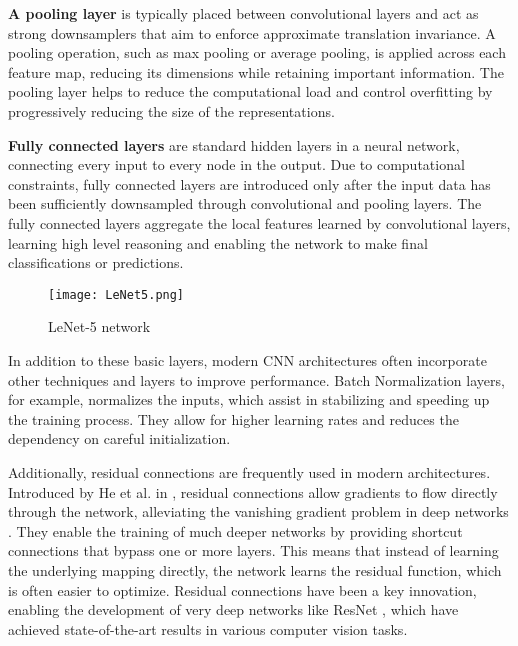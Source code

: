 \documentclass[../../thesis.tex]{subfiles}
\begin{document}
\textbf{A pooling layer} is typically placed between convolutional layers and act as strong downsamplers that aim to enforce approximate translation invariance. A pooling operation, such as max pooling or average pooling, is applied across each feature map, reducing its dimensions while retaining important information. The pooling layer helps to reduce the computational load and control overfitting by progressively reducing the size of the representations.\newline

\textbf{Fully connected layers} are standard hidden layers in a neural network, connecting every input to every node in the output. Due to computational constraints, fully connected layers are introduced only after the input data has been sufficiently downsampled through convolutional and pooling layers. The fully connected layers aggregate the local features learned by convolutional layers, learning high level reasoning and enabling the network to make final classifications or predictions.\newline

\begin{figure}[h]
    \centering
    \texttt{[image: LeNet5.png]}
    \caption{LeNet-5 network \cite{LeCun1989ConvNet}}
    \label{fig:LeNet5}
\end{figure}

In addition to these basic layers, modern CNN architectures often incorporate other techniques and layers to improve performance. Batch Normalization layers, for example, normalizes the inputs, which assist in stabilizing and speeding up the training process. They allow for higher learning rates and reduces the dependency on careful initialization.\newline

Additionally, residual connections are frequently used in modern architectures. Introduced by He et al. in \cite{he2015deep}, residual connections allow gradients to flow directly through the network, alleviating the vanishing gradient problem in deep networks \cite{279181}. They enable the training of much deeper networks by providing shortcut connections that bypass one or more layers. This means that instead of learning the underlying mapping directly, the network learns the residual function, which is often easier to optimize. Residual connections have been a key innovation, enabling the development of very deep networks like ResNet \cite{he2015deep}, which have achieved state-of-the-art results in various computer vision tasks.
\end{document}
